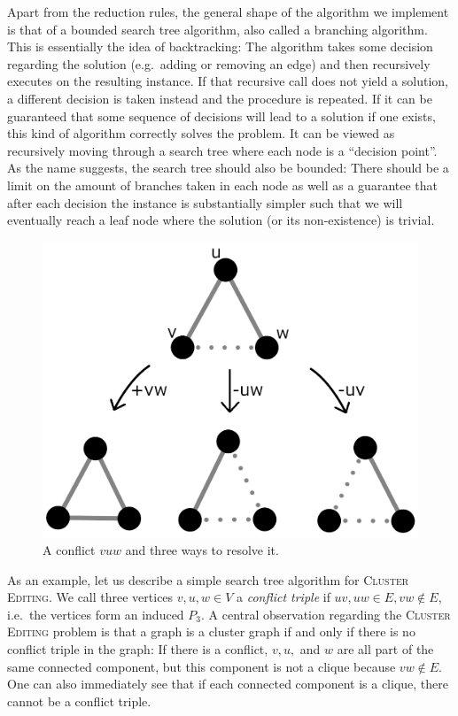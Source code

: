 \documentclass[12pt,oneside,english,parskip=full,headings=small]{scrbook}
\theoremstyle{definition}
\begin{document}
Apart from the reduction rules, the general shape of the algorithm we implement is that of a bounded
search tree algorithm, also called a branching algorithm. This is essentially the idea of
backtracking: The algorithm takes some decision regarding the solution (e.g.\ adding or removing an
edge) and then recursively executes on the resulting instance. If that recursive call does not yield
a solution, a different decision is taken instead and the procedure is repeated. If it can be
guaranteed that some sequence of decisions will lead to a solution if one exists, this kind of
algorithm correctly solves the problem. It can be viewed as recursively moving through a search tree
where each node is a ``decision point''. As the name suggests, the search tree should also be bounded:
There should be a limit on the amount of branches taken in each node as well as a guarantee that
after each decision the instance is substantially simpler such that we will eventually reach a leaf
node where the solution (or its non-existence) is trivial.

\begin{figure}[h]
	\centering
	\includegraphics[scale=0.5]{conflicts}
	\caption{A conflict $v u w$ and three ways to resolve it.}
	\label{fig:conflicts}
\end{figure}

As an example, let us describe a simple search tree algorithm for \textsc{Cluster Editing}. We call
three vertices $v, u, w \in V$ a \emph{conflict triple} if $uv, uw \in E, vw \notin E$, i.e.\ the
vertices form an induced $P_3$. A central observation regarding the \textsc{Cluster Editing} problem
is that a graph is a cluster graph if and only if there is no conflict triple in the graph: If there
is a conflict, $v, u,$ and $w$ are all part of the same connected component, but this component is
not a clique because $vw \notin E$. One can also immediately see that if each connected component is
a clique, there cannot be a conflict triple.
\end{document}
